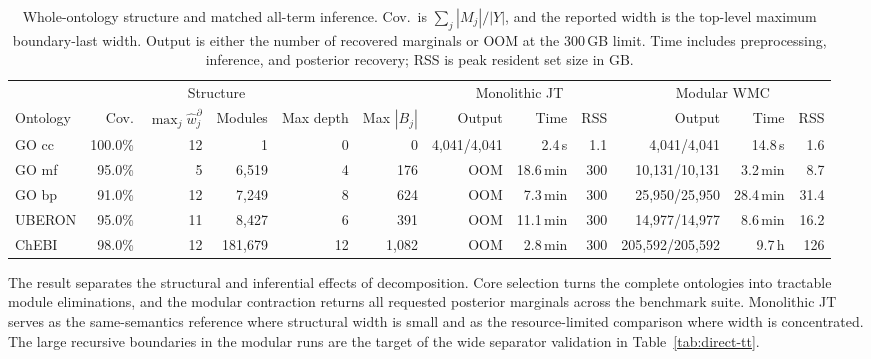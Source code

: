 \documentclass[letterpaper]{article}
\begin{document}
\begin{table}[t]
\centering
\scriptsize
\setlength{\tabcolsep}{1.6pt}
\begin{tabular}{lrrrrr|rrr|rrr}
\toprule
\multicolumn{6}{c|}{Structure}
&
\multicolumn{3}{c|}{Monolithic JT}
&
\multicolumn{3}{c}{Modular WMC} \\
\cmidrule(lr){1-6}
\cmidrule(lr){7-9}
\cmidrule(lr){10-12}
Ontology
& Cov.
& \(\max_j \widehat w_j^\partial\)
& Modules
& Max depth
& Max \( |B_j| \)
& Output
& Time
& RSS
& Output
& Time
& RSS \\
\midrule
GO cc
& 100.0\%
& 12
& 1
& 0
& 0
& 4,041/4,041
& 2.4\,s
& 1.1
& 4,041/4,041
& 14.8\,s
& 1.6 \\

GO mf
& 95.0\%
& 5
& 6,519
& 4
& 176
& OOM
& 18.6\,min
& 300
& 10,131/10,131
& 3.2\,min
& 8.7 \\

GO bp
& 91.0\%
& 12
& 7,249
& 8
& 624
& OOM
& 7.3\,min
& 300
& 25,950/25,950
& 28.4\,min
& 31.4 \\

UBERON
& 95.0\%
& 11
& 8,427
& 6
& 391
& OOM
& 11.1\,min
& 300
& 14,977/14,977
& 8.6\,min
& 16.2 \\

ChEBI
& 98.0\%
& 12
& 181,679
& 12
& 1,082
& OOM
& 2.8\,min
& 300
& 205,592/205,592
& 9.7\,h
& 126 \\
\bottomrule
\end{tabular}

\caption{
Whole-ontology structure and matched all-term inference.
Cov.\ is \(\sum_j |M_j|/|Y|\), and the reported width is the
top-level maximum boundary-last width. Output is either the number
of recovered marginals or OOM at the 300\,GB limit. Time includes
preprocessing, inference, and posterior recovery; RSS is peak resident set
size in GB.
}
\label{tab:operational-scale}
\end{table}

The result separates the structural and inferential effects of
decomposition. Core selection turns the complete ontologies into tractable
module eliminations, and the modular contraction returns all requested
posterior marginals across the benchmark suite. Monolithic JT serves as the
same-semantics reference where structural width is small and as the
resource-limited comparison where width is concentrated. The large
recursive boundaries in the modular runs are the target of the wide
separator validation in Table~\ref{tab:direct-tt}.
\end{document}
